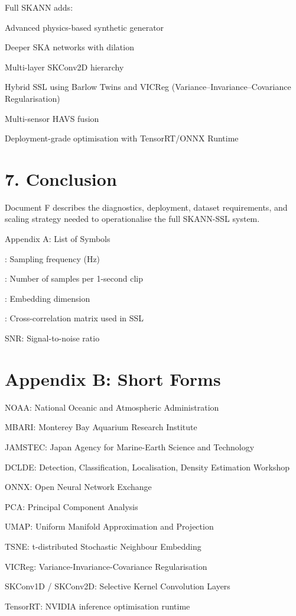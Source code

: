 \documentclass[12pt]{article}
\begin{document}
Full SKANN adds:

Advanced physics-based synthetic generator

Deeper SKA networks with dilation

Multi-layer SKConv2D hierarchy

Hybrid SSL using Barlow Twins and VICReg (Variance–Invariance–Covariance Regularisation)

Multi-sensor HAVS fusion

Deployment-grade optimisation with TensorRT/ONNX Runtime

\section*{7. Conclusion}
Document F describes the diagnostics, deployment, dataset requirements, and scaling strategy needed to operationalise the full SKANN-SSL system.

Appendix A: List of Symbols

: Sampling frequency (Hz)

: Number of samples per 1-second clip

: Embedding dimension

: Cross-correlation matrix used in SSL

SNR: Signal-to-noise ratio

\section*{Appendix B: Short Forms}
NOAA: National Oceanic and Atmospheric Administration

MBARI: Monterey Bay Aquarium Research Institute

JAMSTEC: Japan Agency for Marine-Earth Science and Technology

DCLDE: Detection, Classification, Localisation, Density Estimation Workshop

ONNX: Open Neural Network Exchange

PCA: Principal Component Analysis

UMAP: Uniform Manifold Approximation and Projection

TSNE: t-distributed Stochastic Neighbour Embedding

VICReg: Variance-Invariance-Covariance Regularisation

SKConv1D / SKConv2D: Selective Kernel Convolution Layers

TensorRT: NVIDIA inference optimisation runtime
\end{document}

